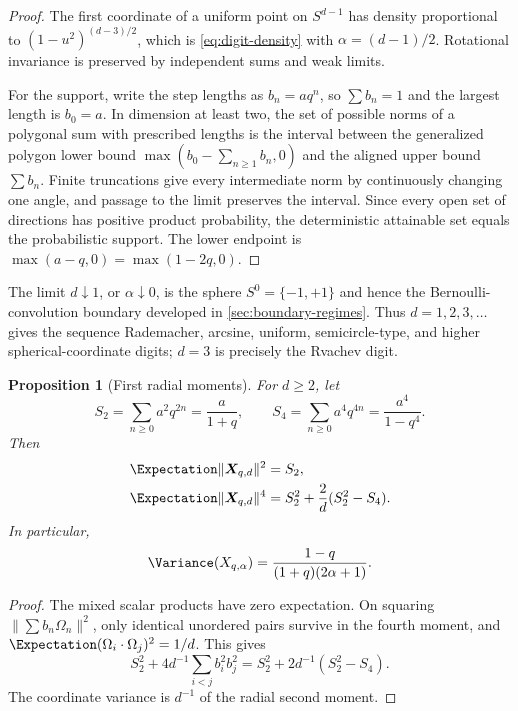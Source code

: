 \documentclass[11pt]{article}
\newtheorem{proposition}[theorem]{Proposition}
\theoremstyle{definition}
\theoremstyle{remark}
\begin{document}
\begin{proof}
The first coordinate of a uniform point on \(S^{d-1}\) has density
proportional to \((1-u^2)^{(d-3)/2}\), which is
\eqref{eq:digit-density} with \(\alpha=(d-1)/2\).  Rotational invariance is
preserved by independent sums and weak limits.

For the support, write the step lengths as \(b_n=aq^n\), so
\(\sum b_n=1\) and the largest length is \(b_0=a\).  In dimension at least
two, the set of possible norms of a polygonal sum with prescribed lengths is
the interval between the generalized polygon lower bound
\(\max(b_0-\sum_{n\ge1}b_n,0)\) and the aligned upper bound \(\sum b_n\).
Finite truncations give every intermediate norm by continuously changing one
angle, and passage to the limit preserves the interval.  Since every open
set of directions has positive product probability, the deterministic
attainable set equals the probabilistic support.  The lower endpoint is
\(\max(a-q,0)=\max(1-2q,0)\).
\end{proof}

The limit \(d\downarrow1\), or \(\alpha\downarrow0\), is the sphere
\(S^0=\{-1,+1\}\) and hence the Bernoulli-convolution boundary developed in
\cref{sec:boundary-regimes}.  Thus \(d=1,2,3,\ldots\) gives the sequence
Rademacher, arcsine, uniform, semicircle-type, and higher spherical-coordinate
digits; \(d=3\) is precisely the Rvachev digit.

\begin{proposition}[First radial moments]
\label{prop:radial-moments}
For \(d\ge2\), let
\[
 S_2=\sum_{n\ge0}a^2q^{2n}=\frac{a}{1+q},
 \qquad
 S_4=\sum_{n\ge0}a^4q^{4n}=\frac{a^4}{1-q^4}.
\]
Then
\begin{align}
 \Expectation\|\bm X_{q,d}\|^2&=S_2,\label{eq:radial-second}\\
 \Expectation\|\bm X_{q,d}\|^4&=S_2^2+\frac2d(S_2^2-S_4).
 \label{eq:radial-fourth}
\end{align}
In particular,
\begin{equation}
 \Variance(X_{q,\alpha})
 =\frac{1-q}{(1+q)(2\alpha+1)}.
 \label{eq:cascade-variance}
\end{equation}
\end{proposition}

\begin{proof}
The mixed scalar products have zero expectation.  On squaring
\(\|\sum b_n\Omega_n\|^2\), only identical unordered pairs survive in the
fourth moment, and
\(\Expectation(\Omega_i\cdot\Omega_j)^2=1/d\).  This gives
\[
 S_2^2+4d^{-1}\sum_{i<j}b_i^2b_j^2
 =S_2^2+2d^{-1}(S_2^2-S_4).
\]
The coordinate variance is \(d^{-1}\) of the radial second moment.
\end{proof}
\end{document}
